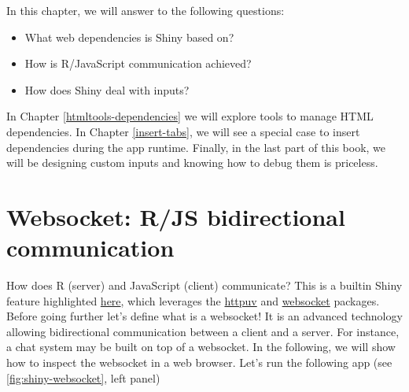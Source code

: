 \documentclass[
]{book}
\newenvironment{Shaded}{\begin{snugshade}}{\end{snugshade}}
\newcommand{\ControlFlowTok}[1]{\textcolor[rgb]{0.13,0.29,0.53}{\textbf{#1}}}
\newcommand{\DataTypeTok}[1]{\textcolor[rgb]{0.13,0.29,0.53}{#1}}
\newcommand{\KeywordTok}[1]{\textcolor[rgb]{0.13,0.29,0.53}{\textbf{#1}}}
\newcommand{\NormalTok}[1]{#1}
\newcommand{\OperatorTok}[1]{\textcolor[rgb]{0.81,0.36,0.00}{\textbf{#1}}}
\newcommand{\OtherTok}[1]{\textcolor[rgb]{0.56,0.35,0.01}{#1}}
\newcommand{\StringTok}[1]{\textcolor[rgb]{0.31,0.60,0.02}{#1}}
\providecommand{\tightlist}{%
  \setlength{\itemsep}{0pt}\setlength{\parskip}{0pt}}
\begin{document}
In this chapter, we will answer to the following questions:

\begin{itemize}
\tightlist
\item
  What web dependencies is Shiny based on?
\item
  How is R/JavaScript communication achieved?
\item
  How does Shiny deal with inputs?
\end{itemize}

In Chapter \ref{htmltools-dependencies} we will explore tools to manage HTML dependencies. In Chapter \ref{insert-tabs}, we will see a special case to insert dependencies during the app runtime. Finally, in the last part of this book, we will be designing custom inputs and knowing how to debug them is priceless.

\hypertarget{shiny-websocket}{%
\section{Websocket: R/JS bidirectional communication}\label{shiny-websocket}}

How does R (server) and JavaScript (client) communicate? This is a builtin Shiny feature highlighted \href{https://github.com/rstudio/shiny}{here}, which leverages the \href{https://github.com/rstudio/httpuv}{httpuv} and \href{https://github.com/rstudio/websocket}{websocket} packages. Before going further let's define what is a websocket! It is an advanced technology allowing bidirectional communication between a client and a server. For instance, a chat system may be built on top of a websocket. In the following, we will show how to inspect the websocket in a web browser. Let's run the following app (see \ref{fig:shiny-websocket}, left panel)

\begin{Shaded}
\end{Shaded}
\end{document}

